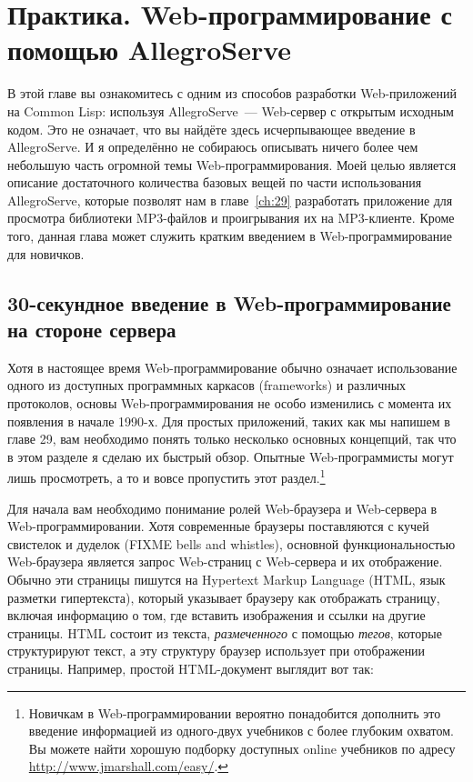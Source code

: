 \chapter{Практика. Web-программирование с помощью AllegroServe}
\label{ch:26}

В этой главе вы ознакомитесь с одним из способов разработки Web-приложений на Common Lisp:
используя AllegroServe~--- Web-сервер с открытым исходным кодом. Это не означает, что вы
найдёте здесь исчерпывающее введение в AllegroServe. И я определённо не собираюсь
описывать ничего более чем небольшую часть огромной темы Web-программирования. Моей целью
является описание достаточного количества базовых вещей по части использования
AllegroServe, которые позволят нам в главе~\ref{ch:29} разработать приложение для
просмотра библиотеки MP3-файлов и проигрывания их на MP3-клиенте. Кроме того, данная глава
может служить кратким введением в Web-программирование для новичков.

\section{30-секундное введение в Web-программирование на стороне сервера}

Хотя в настоящее время Web-программирование обычно означает использование одного из
доступных программных каркасов (frameworks) и различных протоколов, основы
Web-программирования не особо изменились с момента их появления в начале 1990-х. Для
простых приложений, таких как мы напишем в главе 29, вам необходимо понять только
несколько основных концепций, так что в этом разделе я сделаю их быстрый обзор. Опытные
Web-программисты могут лишь просмотреть, а то и вовсе пропустить этот
раздел.\footnote{Новичкам в Web-программировании вероятно понадобится дополнить это
  введение информацией из одного-двух учебников с более глубоким охватом. Вы можете найти
  хорошую подборку доступных online учебников по адресу
  \url{http://www.jmarshall.com/easy/}.}

Для начала вам необходимо понимание ролей Web-браузера и Web-сервера в
Web-программировании. Хотя современные браузеры поставляются с кучей свистелок и дуделок
(FIXME bells and whistles), основной функциональностью Web-браузера является запрос
Web-страниц с Web-сервера и их отображение. Обычно эти страницы пишутся на Hypertext
Markup Language (HTML, язык разметки гипертекста), который указывает браузеру как
отображать страницу, включая информацию о том, где вставить изображения и ссылки на другие
страницы. HTML состоит из текста, \textit{размеченного} с помощью \textit{тегов}, которые
структурируют текст, а эту структуру браузер использует при отображении
страницы. Например, простой HTML-документ выглядит вот так:


